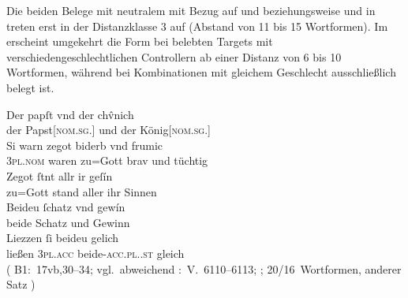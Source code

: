 Die beiden Belege mit neutralem  mit Bezug auf 
 und   beziehungsweise 
 und   in  treten erst in
der Distanzklasse 3 auf (Abstand von 11 bis 15 Wortformen). Im \CAO{} erscheint
umgekehrt die Form  bei belebten Targets mit
verschieden\-geschlechtlichen Controllern ab einer Distanz von 6 bis 10
Wortformen, während bei Kombinationen mit gleichem Geschlecht ausschließlich
 belegt ist.

\begin{exe}
\ex \label{ex:combgenddist2}
	\begin{xlist}
	\ex\label{ex:papstkoenig6} %
		\gll Der papſt vnd der chv̂nich \\
			der Papst[\textsc{nom.sg.\MascM}] und der
			König[\textsc{nom.sg.\MascM}] \\
	\sn \gll Si warn zegot biderb vnd frumic \\
			\textsc{3pl\subM.nom} waren {zu=Gott} brav und tüchtig \\
	\sn \gll Zegot ſtnt allr ir geſín \\
			{zu=Gott} stand aller ihr Sinnen \\
	\sn \gll Beideu ſchatz vnd gewín \\
			beide Schatz und Gewinn \\
	\sn \gll Liezzen ſi beideu gelich \\
			ließen \textsc{3pl\subM.acc} beide-\textsc{acc.pl.\NeutM.st}
			gleich \\
		\trans {}
			(%
				B1:~17vb,30--34; vgl.~abweichend
				\KC:~V.~6110--6113;
				\cite[194]{schroeder1895};
				20/16~Wortformen, anderer Satz%
			)

	\end{xlist}
\end{exe}

